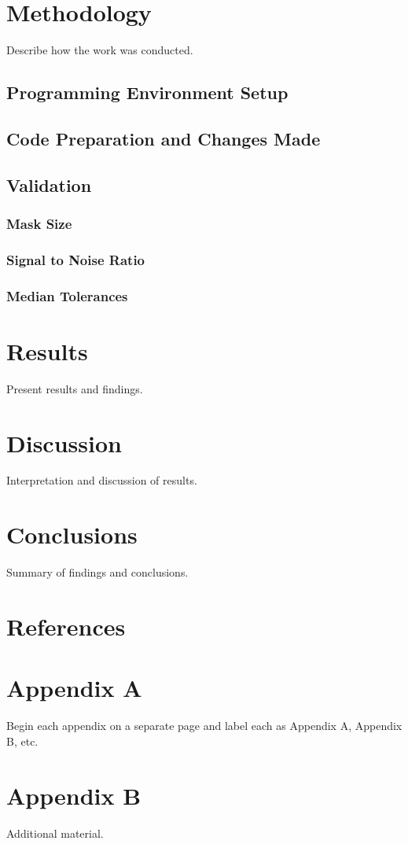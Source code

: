 \documentclass[12pt]{report}
\begin{document}
\chapter{Methodology}
Describe how the work was conducted.
\section{Programming Environment Setup}
\section{Code Preparation and Changes Made}
\section{Validation}
\subsection{Mask Size}
\subsection{Signal to Noise Ratio}
\subsection{Median Tolerances}


\chapter{Results}
Present results and findings.

\chapter{Discussion}
Interpretation and discussion of results.

\chapter{Conclusions}
Summary of findings and conclusions.

\chapter*{References}

\appendix

\chapter{Appendix A}
Begin each appendix on a separate page and label each as Appendix A, Appendix B, etc.

\chapter{Appendix B}
Additional material.
\end{document}

